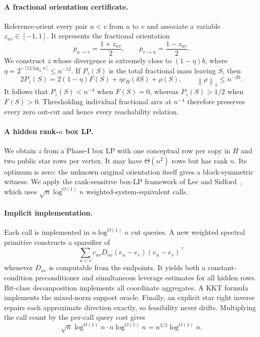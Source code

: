 \documentclass[11pt]{article}
\theoremstyle{definition}
\newcommand{\cH}{c_H}
\newcommand{\norm}[1]{\left\lVert #1\right\rVert}
\begin{document}
\paragraph{A fractional orientation certificate.}
Reference-orient every pair $u<v$ from $u$ to $v$ and associate a variable
$z_{uv}\in[-1,1]$.  It represents the fractional orientation
\[
 p_{u\to v}=\frac{1+z_{uv}}2,
 \qquad p_{v\to u}=\frac{1-z_{uv}}2.
\]
We construct $z$ whose divergence is extremely close to $(1-\eta)b$, where
$\eta=2^{-\lceil12\log_2n\rceil}\le n^{-12}$.  If $P_z(S)$ is the total fractional mass
leaving $S$, then
\[
  2P_z(S)=2(1-\eta)F(S)+\eta\cH(\delta S)+\rho(S),
  \qquad \norm{\rho}_1\le n^{-20}.
\]
It follows that $P_z(S)<n^{-4}$ when $F(S)=0$, whereas
$P_z(S)>1/2$ when $F(S)>0$.  Thresholding individual fractional arcs at
$n^{-4}$ therefore preserves every zero out-cut and hence every reachability
relation.

\paragraph{A hidden rank-$n$ box LP.}
We obtain $z$ from a Phase-I box LP with one conceptual row per copy in $H$
and two public star rows per vertex.  It may have $\Theta(n^2)$ rows but has
rank $n$.  Its optimum is zero: the unknown original orientation itself gives
a block-symmetric witness.  We apply the rank-sensitive box-LP framework of
Lee and Sidford~\cite{LeeSidford2020}, which uses
$\sqrt n\log^{O(1)}n$ weighted-system-equivalent calls.

\paragraph{Implicit implementation.}
Each call is implemented in $n\log^{O(1)}n$ cut queries.  A new weighted
spectral primitive constructs a sparsifier of
\[
  \sum_{u<v}c_{uv}D_{uv}(e_u-e_v)(e_u-e_v)^\top
\]
whenever $D_{uv}$ is computable from the endpoints.  It yields both a
constant-condition preconditioner and simultaneous leverage estimates for
all hidden rows.  Bit-class decomposition implements all coordinate
aggregates.  A KKT formula implements the mixed-norm support oracle.  Finally,
an explicit star right inverse repairs each approximate direction exactly, so
feasibility never drifts.  Multiplying the call count by the
per-call query cost gives
\[
  \sqrt n\log^{O(1)}n\cdot n\log^{O(1)}n
       =n^{3/2}\log^{O(1)}n.
\]
\end{document}
